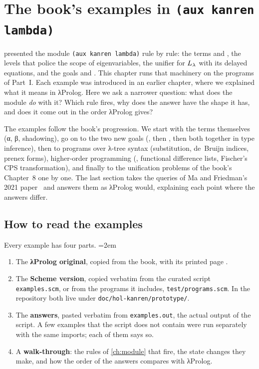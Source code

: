 \chapter{The book's examples in \texorpdfstring{\texttt{(aux kanren lambda)}}{(aux kanren lambda)}}\label{ch:examples}

 presented the module \texttt{(aux kanren lambda)} rule by rule: the terms  and
, the levels that police the scope of eigenvariables,
the unifier for $L_\lambda$ with its delayed equations, and the goals  and . This chapter
runs that machinery on the programs of Part~I. Each example was introduced in an earlier chapter, where
we explained what it means in λProlog. Here we ask a narrower question: what does the module
\emph{do} with it? Which rule fires, why does the answer have the shape it has, and does it come out in
the order λProlog gives?

The examples follow the book's progression. We start with the terms themselves (α, β, shadowing), go
on to the two new goals (, then , then both together in type inference), then to
programs over λ-tree syntax (substitution, de~Bruijn indices, prenex forms), higher-order programming
(, functional difference lists, Fischer's CPS transformation), and finally to the
unification problems of the book's Chapter~8 one by one. The last section takes the queries of Ma and
Friedman's 2021 paper~\cite{MaFriedman2021} and answers them as λProlog would, explaining each point
where the answers differ.

\section{How to read the examples}\label{sec:examples-howto}

Every example has four parts.
\begingroup\emergencystretch=2em
\begin{enumerate}
  \item The \textbf{λProlog original}, copied from the book, with its printed page
    .
  \item The \textbf{Scheme version}, copied verbatim from the curated script \texttt{examples.scm}, or
    from the programs it includes, \texttt{test/programs.scm}. In the repository both live under
    \texttt{doc/hol-kanren/prototype/}.
  \item The \textbf{answers}, pasted verbatim from \texttt{examples.out}, the actual output of the
    script. A few examples that the script does not contain were run separately with the same imports;
    each of them says so.
  \item A \textbf{walk-through}: the rules of \cref{ch:module} that fire, the state changes they make,
    and how the order of the answers compares with λProlog.
\end{enumerate}
\endgroup

